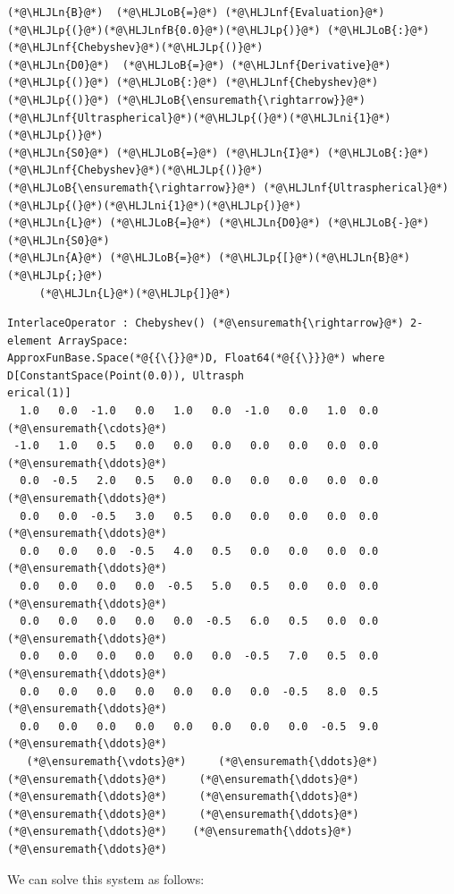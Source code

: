 \documentclass[12pt,a4paper]{article}
\newcommand{\HLJLn}[1]{#1}
\newcommand{\HLJLnf}[1]{\textcolor[RGB]{66,102,213}{#1}}
\newcommand{\HLJLnfB}[1]{\textcolor[RGB]{59,151,46}{#1}}
\newcommand{\HLJLni}[1]{\textcolor[RGB]{59,151,46}{#1}}
\newcommand{\HLJLoB}[1]{\textcolor[RGB]{102,102,102}{\textbf{#1}}}
\newcommand{\HLJLp}[1]{#1}
\begin{document}
\begin{lstlisting}
(*@\HLJLn{B}@*)  (*@\HLJLoB{=}@*) (*@\HLJLnf{Evaluation}@*)(*@\HLJLp{(}@*)(*@\HLJLnfB{0.0}@*)(*@\HLJLp{)}@*) (*@\HLJLoB{:}@*) (*@\HLJLnf{Chebyshev}@*)(*@\HLJLp{()}@*)
(*@\HLJLn{D0}@*)  (*@\HLJLoB{=}@*) (*@\HLJLnf{Derivative}@*)(*@\HLJLp{()}@*) (*@\HLJLoB{:}@*) (*@\HLJLnf{Chebyshev}@*)(*@\HLJLp{()}@*) (*@\HLJLoB{\ensuremath{\rightarrow}}@*) (*@\HLJLnf{Ultraspherical}@*)(*@\HLJLp{(}@*)(*@\HLJLni{1}@*)(*@\HLJLp{)}@*)
(*@\HLJLn{S0}@*) (*@\HLJLoB{=}@*) (*@\HLJLn{I}@*) (*@\HLJLoB{:}@*) (*@\HLJLnf{Chebyshev}@*)(*@\HLJLp{()}@*) (*@\HLJLoB{\ensuremath{\rightarrow}}@*) (*@\HLJLnf{Ultraspherical}@*)(*@\HLJLp{(}@*)(*@\HLJLni{1}@*)(*@\HLJLp{)}@*)
(*@\HLJLn{L}@*) (*@\HLJLoB{=}@*) (*@\HLJLn{D0}@*) (*@\HLJLoB{-}@*) (*@\HLJLn{S0}@*)
(*@\HLJLn{A}@*) (*@\HLJLoB{=}@*) (*@\HLJLp{[}@*)(*@\HLJLn{B}@*)(*@\HLJLp{;}@*)
     (*@\HLJLn{L}@*)(*@\HLJLp{]}@*)
\end{lstlisting}

\begin{lstlisting}
InterlaceOperator : Chebyshev() (*@\ensuremath{\rightarrow}@*) 2-element ArraySpace:
ApproxFunBase.Space(*@{{\{}}@*)D, Float64(*@{{\}}}@*) where D[ConstantSpace(Point(0.0)), Ultrasph
erical(1)]
  1.0   0.0  -1.0   0.0   1.0   0.0  -1.0   0.0   1.0  0.0  (*@\ensuremath{\cdots}@*)
 -1.0   1.0   0.5   0.0   0.0   0.0   0.0   0.0   0.0  0.0  (*@\ensuremath{\ddots}@*)
  0.0  -0.5   2.0   0.5   0.0   0.0   0.0   0.0   0.0  0.0  (*@\ensuremath{\ddots}@*)
  0.0   0.0  -0.5   3.0   0.5   0.0   0.0   0.0   0.0  0.0  (*@\ensuremath{\ddots}@*)
  0.0   0.0   0.0  -0.5   4.0   0.5   0.0   0.0   0.0  0.0  (*@\ensuremath{\ddots}@*)
  0.0   0.0   0.0   0.0  -0.5   5.0   0.5   0.0   0.0  0.0  (*@\ensuremath{\ddots}@*)
  0.0   0.0   0.0   0.0   0.0  -0.5   6.0   0.5   0.0  0.0  (*@\ensuremath{\ddots}@*)
  0.0   0.0   0.0   0.0   0.0   0.0  -0.5   7.0   0.5  0.0  (*@\ensuremath{\ddots}@*)
  0.0   0.0   0.0   0.0   0.0   0.0   0.0  -0.5   8.0  0.5  (*@\ensuremath{\ddots}@*)
  0.0   0.0   0.0   0.0   0.0   0.0   0.0   0.0  -0.5  9.0  (*@\ensuremath{\ddots}@*)
   (*@\ensuremath{\vdots}@*)     (*@\ensuremath{\ddots}@*)     (*@\ensuremath{\ddots}@*)     (*@\ensuremath{\ddots}@*)     (*@\ensuremath{\ddots}@*)     (*@\ensuremath{\ddots}@*)     (*@\ensuremath{\ddots}@*)     (*@\ensuremath{\ddots}@*)     (*@\ensuremath{\ddots}@*)    (*@\ensuremath{\ddots}@*)   (*@\ensuremath{\ddots}@*)
\end{lstlisting}


We can solve this system as follows:
\end{document}
